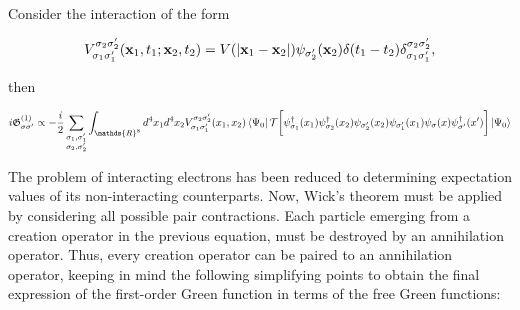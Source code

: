 Consider the interaction of the form 

$$
    V_{\sigma_1\sigma'_1}^{\sigma_2\sigma'_2}({{\bf x}}_1, t_1; {{\bf x}}_2, t_2) = V(|{{\bf x}}_1 - {{\bf x}}_2|) \psi_{\sigma_2'}({{\bf x}}_2) \delta(t_1-t_2) \delta_{\sigma_1\sigma'_1}^{\sigma_2\sigma'_2},
$$

then

\begin{equation}
    \begin{split}
        i \mathfrak{G}_{\sigma \sigma'}^{(1)} \propto - \frac{i}{2} \sum_{{\substack{\sigma_1, \sigma'_1 
         \\ \sigma_2, \sigma_2'}}}
        \int_{\mathds{R}^8} d^4x_1 d^4x_2 V_{\sigma_1\sigma'_1}^{\sigma_2\sigma'_2}(x_1, x_2) \bra{\Psi_0} \mathcal{T} \bigg[ \psi_{\sigma_1}^\dagger(x_1) \psi_{\sigma_2}^\dagger(x_2) \psi_{\sigma'_2}(x_2) \psi_{\sigma'_1}(x_1) \psi_{\sigma}(x) \psi^\dagger_{\sigma'}(x') \bigg] \ket{\Psi_0}
        \label{first_order_perturb_Green_function}
    \end{split}
\end{equation}

The problem of interacting electrons has been reduced to determining expectation values of its non-interacting counterparts. Now, Wick's theorem must be applied by considering all possible pair contractions. Each particle emerging from a creation operator in the previous equation, must be destroyed by an annihilation operator. Thus, every creation operator can be paired to an annihilation operator, keeping in mind the following simplifying points to obtain the final expression of the first-order Green function in terms of the free Green functions:


